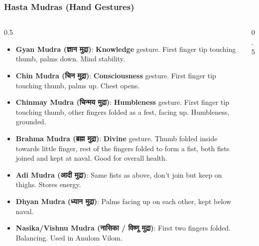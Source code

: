 \begin{frame}[fragile]\frametitle{Hasta Mudras (Hand Gestures)}
\begin{columns}
    \begin{column}[T]{0.5\linewidth}
      \begin{itemize}
        \item \textbf{Gyan Mudra (ज्ञान मुद्रा)}: \textbf{Knowledge} gesture. First finger tip touching thumb, palms down. Mind stability.
        \item \textbf{Chin Mudra (चिन मुद्रा)}: \textbf{Consciousness} gesture. First finger tip touching thumb, palms up. Chest opens.
        \item \textbf{Chinmay Mudra (चिन्मय  मुद्रा)}: \textbf{Humbleness} gesture. First finger tip touching thumb, other fingers folded as a fest, facing up. Humbleness, grounded.	
		\item \textbf{Brahma Mudra (ब्रह्म   मुद्रा)}: \textbf{Divine} gesture. Thumb folded inside towards little finger, rest of the fingers folded to form a fist, both fists joined and kept at naval. Good for overall health.
		\item \textbf{Adi Mudra (आदी   मुद्रा)}: Same fists as above, don't join but keep on thighs.  Stores energy.
		\item \textbf{Dhyan Mudra (ध्यान    मुद्रा)}: Palms facing up on each other, kept below naval.
		\item \textbf{Nasika/Vishnu Mudra (नासिका / विष्णू     मुद्रा)}: First two fingers folded. Balancing. Used in Anulom Vilom.
      \end{itemize}
    \end{column}
    \begin{column}[T]{0.5\linewidth}
        \begin{center}

\end{center}
\end{column}
\end{columns}
\end{frame}
